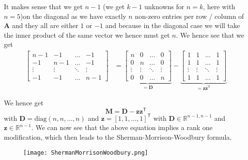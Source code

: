 \documentclass{article}
\begin{document}
It makes sense that we get $n-1$ (we get $k-1$ unknowns for $n = k$, here with $n = 5$)on the diagonal as we have exactly $n$ non-zero entries per row / column of $\mathbf{A}$ and they all are either $1$ or $-1$ and because in the diagonal case we will take the inner product of the same vector we hence must get $n$. We hence see that we get 
\begin{align*}
    \begin{bmatrix}
        n-1 & -1 & \dots & -1 \\
        -1 & n-1 & \dots & -1 \\
        \vdots & \vdots & \ddots & \vdots\\
        -1 & -1 & \dots & n-1
    \end{bmatrix} &= 
\underbrace{\begin{bmatrix}
        n & 0 & \dots & 0 \\
        0 & n & \dots & 0 \\
        \vdots & \vdots & \ddots & \vdots\\
        0 & 0 & \dots & n
    \end{bmatrix}}_{=\mathbf{D}} - 
    \underbrace{\begin{bmatrix}
        1 & 1 & \dots & 1 \\
        1 & 1 & \dots & 1 \\
        \vdots & \vdots & \ddots & \vdots\\
        1 & 1 & \dots & 1
    \end{bmatrix}}_{= \mathbf{z}\mathbf{z}^{\mathsf{T}}}
\end{align*}

\pagebreak

\noindent We hence get 
\begin{equation}
     \mathbf{M} = \mathbf{D} - \mathbf{z}\mathbf{z}^{\mathsf{T}}
\end{equation}
with $\mathbf{D} = \text{diag}\left(n, n, \dots, n\right)$ and $\mathbf{z} = \left[1, 1, \dots, 1\right]^{\mathsf{T}}$ with $\mathbf{D} \in \mathbb{R}^{n-1, n-1
}$ and $\mathbf{z} \in \mathbb{R}^{n-1}$. We can now see that the above equation implies a rank one modification, which then leads to the Sherman-Morrison-Woodbury formula.

\begin{figure}[!hbt]
    \centering
\texttt{[image: ShermanMorrisonWoodbury.png]}
\end{figure}
\end{document}
